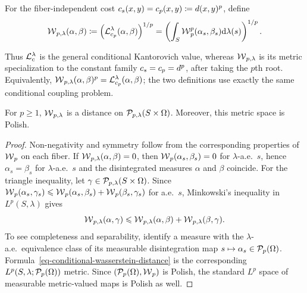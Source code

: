 \begin{defn}\label{def-conditional-wasserstein-distance}
	For the fiber-independent cost $c_s(x,y)=c_p(x,y)\coloneqq d(x,y)^p$, define
	\begin{equation}\label{eq-conditional-wasserstein-distance}
		\operatorname{\mathcal{W}}_{p,\lambda}(\alpha,\beta)
		\coloneqq
		\left(\mathcal{L}_{c_p}^\lambda(\alpha,\beta)\right)^{1/p}
		=
		\left(
		\int_S \operatorname{\mathcal{W}}_p^p(\alpha_s,\beta_s)\mathrm{d}\lambda(s)
		\right)^{1/p}.
	\end{equation}
\end{defn}
Thus $\mathcal{L}_c^\lambda$ is the general conditional Kantorovich value, whereas $\operatorname{\mathcal{W}}_{p,\lambda}$ is its metric specialization to the constant family $c_s=c_p=d^p$, after taking the $p$th root. Equivalently,
$\operatorname{\mathcal{W}}_{p,\lambda}(\alpha,\beta)^p = \mathcal{L}_{c_p}^\lambda(\alpha,\beta)$;
the two definitions use exactly the same conditional coupling problem.

\begin{prop}\label{prop-conditional-wasserstein-distance}
	For $p\geq1$, $\operatorname{\mathcal{W}}_{p,\lambda}$ is a distance on $\mathcal{P}_{p,\lambda}(S\times\Omega)$. Moreover, this metric space is Polish.
\end{prop}
\begin{proof}
	Non-negativity and symmetry follow from the corresponding properties of $\operatorname{\mathcal{W}}_p$ on each fiber. If $\operatorname{\mathcal{W}}_{p,\lambda}(\alpha,\beta)=0$, then $\operatorname{\mathcal{W}}_p(\alpha_s,\beta_s)=0$ for $\lambda$-a.e.\ $s$, hence $\alpha_s=\beta_s$ for $\lambda$-a.e.\ $s$ and the disintegrated measures $\alpha$ and $\beta$ coincide. For the triangle inequality, let $\gamma\in\mathcal{P}_{p,\lambda}(S\times\Omega)$. Since $\operatorname{\mathcal{W}}_p(\alpha_s,\gamma_s)\leqslant\operatorname{\mathcal{W}}_p(\alpha_s,\beta_s)+\operatorname{\mathcal{W}}_p(\beta_s,\gamma_s)$ for a.e.\ $s$, Minkowski's inequality in $L^p(S,\lambda)$ gives
	\[
		\operatorname{\mathcal{W}}_{p,\lambda}(\alpha,\gamma)
		\leqslant
		\operatorname{\mathcal{W}}_{p,\lambda}(\alpha,\beta)+\operatorname{\mathcal{W}}_{p,\lambda}(\beta,\gamma).
	\]
	To see completeness and separability, identify a measure with the $\lambda$-a.e.\ equivalence class of its measurable disintegration map $s\mapsto\alpha_s\in\mathcal{P}_p(\Omega)$. Formula~\eqref{eq-conditional-wasserstein-distance} is the corresponding $L^p(S,\lambda;\mathcal{P}_p(\Omega))$ metric. Since $(\mathcal{P}_p(\Omega),\operatorname{\mathcal{W}}_p)$ is Polish, the standard $L^p$ space of measurable metric-valued maps is Polish as well.
\end{proof}

